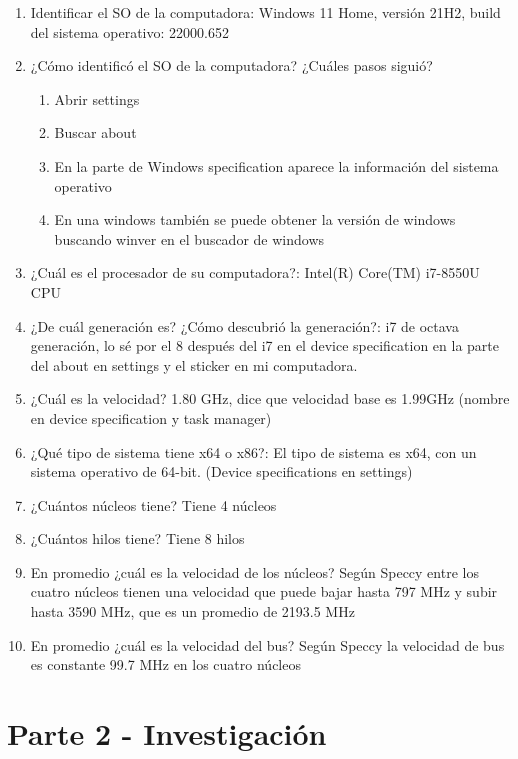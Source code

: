 \documentclass[stu, 12pt, letterpaper, donotrepeattitle, floatsintext, natbib, helv]{apa7}
\begin{document}
\begin{enumerate}
    \item Identificar el SO de la computadora: Windows 11 Home, versión 21H2, build del sistema operativo: 22000.652
    \item ¿Cómo identificó el SO de la computadora? ¿Cuáles pasos siguió?
    \begin{enumerate}
        \item Abrir settings
        \item Buscar about
        \item En la parte de Windows specification aparece la información del sistema operativo
        \item En una windows también se puede obtener la versión de windows buscando winver en el buscador de windows
    \end{enumerate}
    \item ¿Cuál es el procesador de su computadora?: Intel(R) Core(TM) i7-8550U CPU
    \item ¿De cuál generación es? ¿Cómo descubrió la generación?: i7 de octava generación, lo sé por el 8 después del i7 en el device specification en la parte del about en settings y el sticker en mi computadora.
    \item ¿Cuál es la velocidad? 1.80 GHz, dice que velocidad base es 1.99GHz (nombre en device specification y task manager)
    \item ¿Qué tipo de sistema tiene x64 o x86?: El tipo de sistema es x64, con un sistema operativo de 64-bit. (Device specifications en settings)
    \item ¿Cuántos núcleos tiene? Tiene 4 núcleos
    \item ¿Cuántos hilos tiene? Tiene 8 hilos
    \item En promedio ¿cuál es la velocidad de los núcleos? Según Speccy entre los cuatro núcleos tienen una velocidad que puede bajar hasta 797 MHz y subir hasta 3590 MHz, que es un promedio de 2193.5 MHz
    \item En promedio ¿cuál es la velocidad del bus? Según Speccy la velocidad de bus es constante 99.7 MHz en los cuatro núcleos
\end{enumerate}


\section*{Parte 2 - Investigación}
{}
\end{document}
